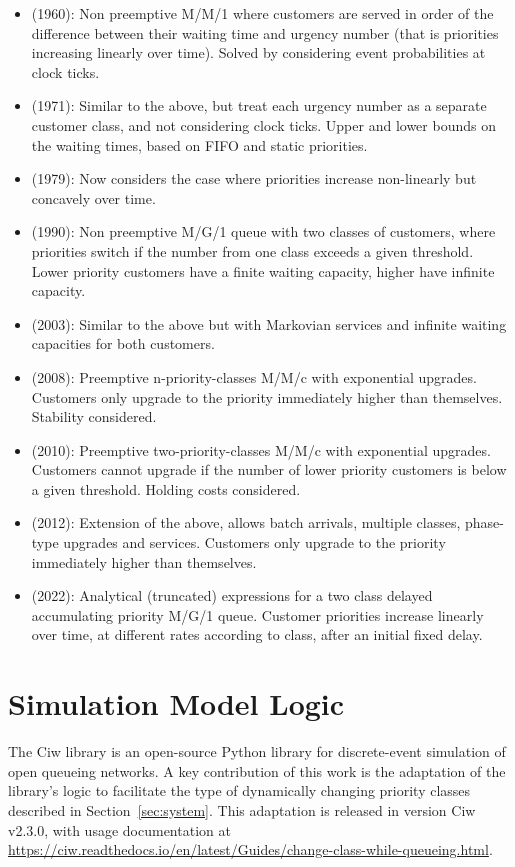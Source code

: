 \documentclass{article}
\begin{document}
\begin{itemize}
  \item \cite{jackson60} (1960): Non preemptive M/M/1 where customers
      are served in order of the difference between their waiting time
        and urgency number (that is priorities increasing linearly over
        time). Solved by considering event probabilities at clock ticks.
  \item \cite{holtzman71} (1971): Similar to the above, but treat each
      urgency number as a separate customer class, and not considering
        clock ticks. Upper and lower bounds on the waiting times, based
        on FIFO and static priorities.
  \item \cite{netterman79} (1979): Now considers the case where
      priorities increase non-linearly but concavely over time.
  \item \cite{fratini90} (1990): Non preemptive M/G/1 queue with two
      classes of customers, where priorities switch if the number from
        one class exceeds a given threshold. Lower priority customers
        have a finite waiting capacity, higher have infinite capacity.
  \item \cite{knessl03} (2003): Similar to the above but with Markovian
      services and infinite waiting capacities for both customers.
  \item \cite{xie08} (2008): Preemptive n-priority-classes M/M/c with
      exponential upgrades. Customers only upgrade to the priority
        immediately higher than themselves. Stability considered.
  \item \cite{down10} (2010): Preemptive two-priority-classes M/M/c with
      exponential upgrades. Customers cannot upgrade if the number of
        lower priority customers is below a given threshold. Holding
        costs considered.
  \item \cite{he12} (2012): Extension of the above, allows batch
      arrivals, multiple classes, phase-type upgrades and services.
        Customers only upgrade to the priority immediately higher than
        themselves.
  \item \cite{bilodeau22} (2022): Analytical (truncated) expressions for
      a two class delayed accumulating priority M/G/1 queue. Customer
        priorities increase linearly over time, at different rates
        according to class, after an initial fixed delay.
\end{itemize}




\section{Simulation Model Logic}\label{sec:simulation}
The Ciw library \cite{palmer19} is an open-source Python library for
discrete-event simulation of open queueing networks. A key contribution of this
work is the adaptation of the library's logic to facilitate the type of
dynamically changing priority classes described in Section~\ref{sec:system}.
This adaptation is released in version Ciw v2.3.0, with usage documentation at
\url{https://ciw.readthedocs.io/en/latest/Guides/change-class-while-queueing.html}.
\end{document}
